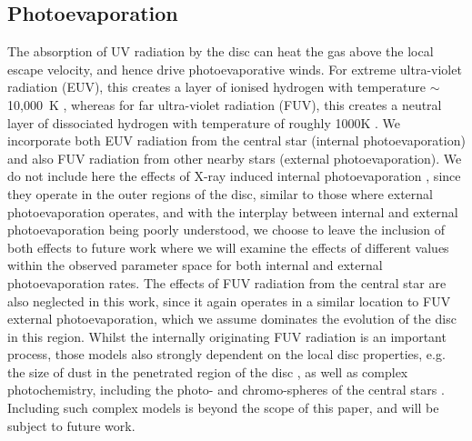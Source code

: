 \documentclass[a4paper,fleqn,usenatbib]{mnras}
\begin{document}
\subsection{Photoevaporation}

The absorption of UV radiation by the disc can heat the gas above the local escape velocity, and hence drive photoevaporative winds.
For extreme ultra-violet radiation (EUV), this creates a layer of ionised hydrogen with temperature $\sim$10,000~K \citep{Clarke2001}, whereas for far ultra-violet radiation (FUV), this creates a neutral layer of dissociated hydrogen with temperature of roughly 1000K \citep{Matsuyama03}.
We incorporate both EUV radiation from the central star (internal photoevaporation) and also FUV radiation from other nearby stars (external photoevaporation).
We do not include here the effects of X-ray induced internal photoevaporation \citep[e.g.][]{Owen12}, since they operate in the outer regions of the disc, similar to those where external photoevaporation operates, and with the interplay between internal and external photoevaporation being poorly understood, we choose to leave the inclusion of both effects to future work where we will examine the effects of different values within the observed parameter space for both internal and external photoevaporation rates.
The effects of FUV radiation from the central star are also neglected in this work, since it again operates in a similar location to FUV external photoevaporation, which we assume dominates the evolution of the disc in this region.
Whilst the internally originating FUV radiation is an important process, those models also strongly dependent on the local disc properties, e.g. the size of dust in the penetrated region of the disc \citep{Gorti15}, as well as complex photochemistry, including the photo- and chromo-spheres of the central stars \citep{Gorti09a,Gorti09}.
Including such complex models is beyond the scope of this paper, and will be subject to future work.
\end{document}

